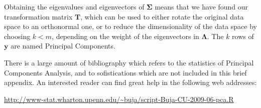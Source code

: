 Obtaining the eigenvalues and eigenvectors of $\mathbf{\Sigma}$ means
that we have found our transformation matrix $\mathbf{T}$, which can
be used to either rotate the original data space to an orthonormal
one, or to reduce the dimensionality of the data space by choosing
$k<m$, depending on the weight of the eigenvectors in
$\mathbf{\Lambda}$. The $k$ rows of $\mathbf{y}$ are named Principal
Components.

There is a large amount of bibliography which refers to the statistics
of Principal Components Analysis, and to sofistications which are not
included in this brief appendix. An interested reader can find great
help in the following web addresses:

\url{http://www-stat.wharton.upenn.edu/~buja/script-Buja-CU-2009-06-pca.R}
\url{}



